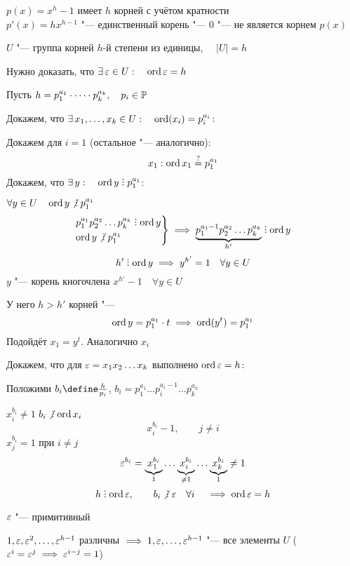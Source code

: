 \begin{eproof}
	\item $ p(x) = x^h - 1 $ имеет $ h $ корней с учётом кратности \\
	$ p'(x) = hx^{h - 1} $ "--- единственный корень "--- 0 "--- не является корнем $ p(x) $
	\item $ U $ "--- группа корней $ h $-й степени из единицы, $ \quad |U| = h $

	Нужно доказать, что $ \exists\, \varepsilon \in U : \quad \operatorname{ord} \varepsilon = h $

	Пусть $ h = p_1^{a_1} \cdot \dots \cdot p_k^{a_k}, \quad p_i \in \mathbb{P} $

	Докажем, что $ \exists\, x_1, \dots, x_k \in U : \quad \operatorname{ord} (x_i) = p_i^{a_i} $:

	Докажем для $ i = 1 $ (остальное "--- аналогично):
	$$ x_1 : \operatorname{ord} x_1 \stackrel?= p_1^{a_1} $$
	Докажем, что $ \exist y : \quad \ord y \divby p_1^{a_1} $:

	 $ \forall y \in U \quad \ord y \ndivby p_1^{a_1} $
	$$
	\begin{rcases}
		p_1^{a_1}p_2^{a_2} \dots p_k^{a_k} \divby \ord y \\
		\ord y \ndivby p_1^{a_1}
	\end{rcases} \implies \underbrace{p_1^{a_1 - 1}p_2^{a_2} \dots p_k^{a_k}}_{h'} \divby \ord y $$
	$$ h' \divby \ord y \implies y^{h'} = 1 \quad \forall y \in U $$
	$ y $ "--- корень кногочлена $ x^{h'} - 1 \quad \forall y \in U $

	У него $ h > h' $ корней "--- \contra
	$$ \operatorname{ord} y = p_1^{a_1} \cdot t \implies \operatorname{ord}(y^t) = p_1^{a_1} $$
	Подойдёт $ x_1 = y^t $. Аналогично $ x_i $

	Докажем, что для $ \varepsilon = x_1x_2 \dots x_k $ выполнено $ \operatorname{ord} \varepsilon = h $:

	Положими $ b_i \define \frac{h}{p_i} $, \ie $ b_i = p_1^{a_1} \dots p_i^{a_i - 1} \dots p_k^{a_k} $

	$ x_i^{b_i} \ne 1 $ \as $ b_i \ndivby \ord x_i $
	$$ x_i^{b_i} - 1, \qquad j \ne i $$
	$ x_j^{b_i} = 1 $ при $ i \ne j $
	$$ \varepsilon^{b_i} = \underbrace{x_1^{b_i}}_1 \dots \underbrace{x_i^{b_i}}_{\ne 1} \dots \underbrace{x_k^{b_i}}_1 \ne 1 $$
	$$ h \divby \ord \veps, \qquad b_i \ndivby \veps \quad \forall i \quad \implies \ord \veps = h $$
	\item $ \varepsilon $ "--- примитивный

	$ 1, \varepsilon, \varepsilon^2, \dots, \varepsilon^{h - 1} $ различны $ \implies 1, \varepsilon, \dots, \varepsilon^{h - 1} $ "--- все элементы $ U $ ($ \varepsilon^i = \varepsilon^j \implies \varepsilon^{i - j} = 1 $)
\end{eproof}

